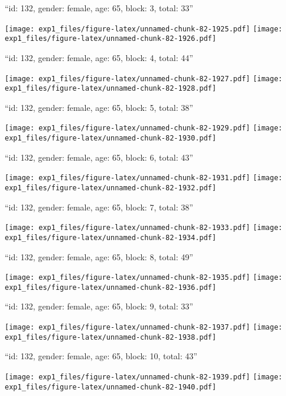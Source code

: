 \documentclass[11pt,,]{article}
\begin{document}
\newpage
[1] 

``id: 132, gender: female, age: 65, block: 3, total: 33''

\texttt{[image: exp1\_files/figure-latex/unnamed-chunk-82-1925.pdf]}
\texttt{[image: exp1\_files/figure-latex/unnamed-chunk-82-1926.pdf]}

\newpage
[1] 

``id: 132, gender: female, age: 65, block: 4, total: 44''

\texttt{[image: exp1\_files/figure-latex/unnamed-chunk-82-1927.pdf]}
\texttt{[image: exp1\_files/figure-latex/unnamed-chunk-82-1928.pdf]}

\newpage
[1] 

``id: 132, gender: female, age: 65, block: 5, total: 38''

\texttt{[image: exp1\_files/figure-latex/unnamed-chunk-82-1929.pdf]}
\texttt{[image: exp1\_files/figure-latex/unnamed-chunk-82-1930.pdf]}

\newpage
[1] 

``id: 132, gender: female, age: 65, block: 6, total: 43''

\texttt{[image: exp1\_files/figure-latex/unnamed-chunk-82-1931.pdf]}
\texttt{[image: exp1\_files/figure-latex/unnamed-chunk-82-1932.pdf]}

\newpage
[1] 

``id: 132, gender: female, age: 65, block: 7, total: 38''

\texttt{[image: exp1\_files/figure-latex/unnamed-chunk-82-1933.pdf]}
\texttt{[image: exp1\_files/figure-latex/unnamed-chunk-82-1934.pdf]}

\newpage
[1] 

``id: 132, gender: female, age: 65, block: 8, total: 49''

\texttt{[image: exp1\_files/figure-latex/unnamed-chunk-82-1935.pdf]}
\texttt{[image: exp1\_files/figure-latex/unnamed-chunk-82-1936.pdf]}

\newpage
[1] 

``id: 132, gender: female, age: 65, block: 9, total: 33''

\texttt{[image: exp1\_files/figure-latex/unnamed-chunk-82-1937.pdf]}
\texttt{[image: exp1\_files/figure-latex/unnamed-chunk-82-1938.pdf]}

\newpage
[1] 

``id: 132, gender: female, age: 65, block: 10, total: 43''

\texttt{[image: exp1\_files/figure-latex/unnamed-chunk-82-1939.pdf]}
\texttt{[image: exp1\_files/figure-latex/unnamed-chunk-82-1940.pdf]}
\end{document}
